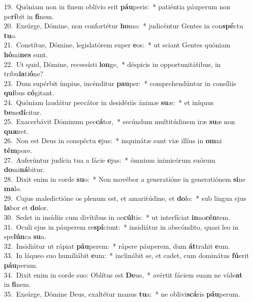 {19.~}Quóniam non in finem oblívio erit \textbf{páu}peris:~* patiéntia páuperum non pe\textbf{rí}bit in \textbf{fi}nem.\\
{20.~}Exsúrge, Dómine, non confortétur \textbf{ho}mo:~* judicéntur Gentes in con\textbf{spé}ctu \textbf{tu}o.\\
{21.~}Constítue, Dómine, legislatórem super \textbf{e}os:~* ut sciant Gentes quóniam \textbf{hó}mi\textbf{nes} sunt.\\
{22.~}Ut quid, Dómine, recessísti \textbf{lon}ge,~* déspicis in opportunitátibus, in tribu\textbf{la}ti\textbf{ó}ne?\\
{23.~}Dum supérbit ímpius, incénditur \textbf{pau}per:~* comprehendúntur in consíliis \textbf{qui}bus \textbf{có}gitant.\\
{24.~}Quóniam laudátur peccátor in desidériis ánimæ \textbf{su}æ:~* et iníquus \textbf{be}ne\textbf{dí}citur.\\
{25.~}Exacerbávit Dóminum pec\textbf{cá}tor,~* secúndum multitúdinem iræ \textbf{su}æ non \textbf{quæ}ret.\\
{26.~}Non est Deus in conspéctu \textbf{e}jus:~* inquinátæ sunt viæ illíus in \textbf{om}ni \textbf{tém}pore.\\
{27.~}Auferúntur judícia tua a fácie \textbf{e}jus:~* ómnium inimicórum suórum \textbf{do}mi\textbf{ná}bitur.\\
{28.~}Dixit enim in corde \textbf{su}o:~* Non movébor a generatióne in generatiónem \textbf{si}ne \textbf{ma}lo.\\
{29.~}Cujus maledictióne os plenum est, et amaritúdine, et \textbf{do}lo:~* sub lingua ejus \textbf{la}bor et \textbf{do}lor.\\
{30.~}Sedet in insídiis cum divítibus in oc\textbf{cúl}tis:~* ut interfíciat \textbf{in}no\textbf{cén}tem.\\
{31.~}Oculi ejus in páuperem re\textbf{spí}ciunt:~* insidiátur in abscóndito, quasi leo in spe\textbf{lún}ca \textbf{su}a.\\
{32.~}Insidiátur ut rápiat \textbf{páu}perem:~* rápere páuperem, dum \textbf{át}trahit \textbf{e}um.\\
{33.~}In láqueo suo humiliábit \textbf{e}um:~* inclinábit se, et cadet, cum dominátus \textbf{fú}erit \textbf{páu}perum.\\
{34.~}Dixit enim in corde suo: Oblítus est \textbf{De}us,~* avértit fáciem suam ne víde\textbf{at} in \textbf{fi}nem.\\
{35.~}Exsúrge, Dómine Deus, exaltétur manus \textbf{tu}a:~* ne oblivi\textbf{scá}ris \textbf{páu}perum.\\
